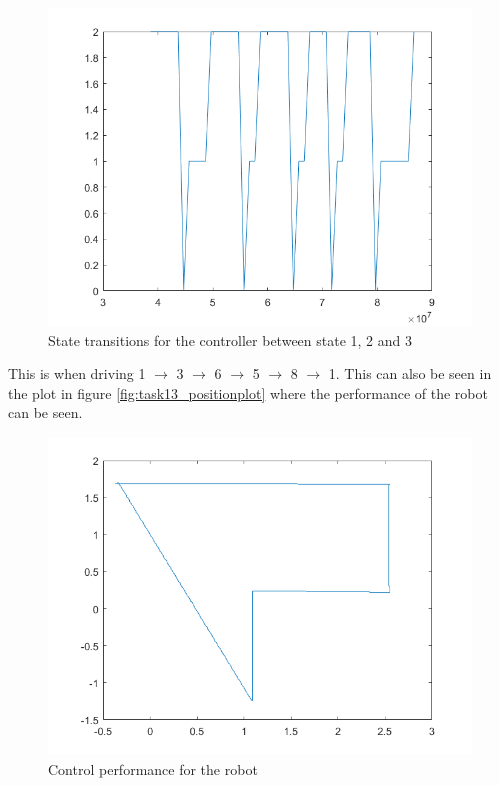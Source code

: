 \documentclass[a4paper,12pt,oneside,onecolumn]{article} %
\begin{document}
\begin{center}
    \begin{figure}[H]
      \centering
      \includegraphics[scale = 0.5]{../matlab/images/task19_trans.png}
      \caption{State transitions for the controller between state 1, 2
      and 3}
      \label{fig:task19_trans}
    \end{figure}
\end{center}

This is when driving 1 $\rightarrow$ 3 $\rightarrow$ 6 $\rightarrow$ 5
$\rightarrow$ 8 $\rightarrow$ 1. This can also be seen in the plot in
figure \ref{fig:task13_positionplot} where the performance of the robot
can be seen.

\begin{center}
    \begin{figure}[H]
      \centering
      \includegraphics[scale=0.5]{../matlab/images/task19_cont.png}
      \caption{Control performance for the robot}
      \label{fig:task19_cont}
    \end{figure}
\end{center}
\end{document}
